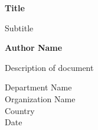 \begin{titlepage}
	\begin{center}
		\vspace*{1cm}
		
		\Huge
		\textbf{Title}
		
		\vspace{0.5cm}
		\LARGE
		Subtitle
		
		\vspace{1.5cm}
		
		\textbf{Author Name}
		
		\vfill
		
		Description of document
		
		\vspace{0.8cm}
		
		\Large
		Department Name\\
		Organization Name\\
		Country\\
		Date
		
	\end{center}
\end{titlepage}